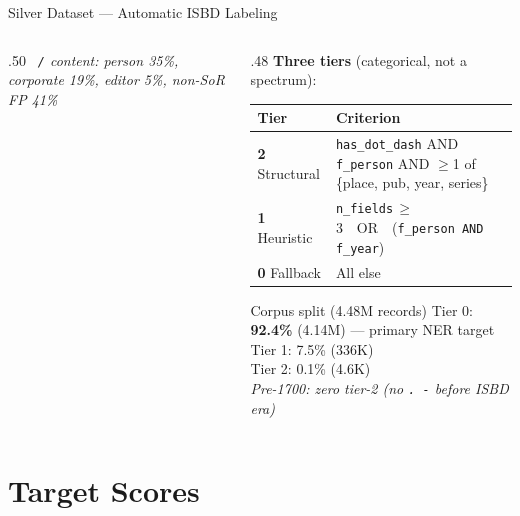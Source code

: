\documentclass[xcolor,aspectratio=169,compress]{beamer}
\begin{document}
\begin{frame}{Silver Dataset --- Automatic ISBD Labeling}
\begin{columns}
\begin{column}{.50\textwidth}
      \textit{\texttt{ /} content: person 35\%, corporate 19\%, editor 5\%, non-SoR FP 41\%}
    \end{column}
    \begin{column}{.48\textwidth}
      \textbf{Three tiers} (categorical, not a spectrum):
      \smallskip
      \begin{tabular}{lp{4.5cm}}
        \toprule
        Tier & Criterion \\
        \midrule
        \textbf{2} Structural &
          \texttt{has\_dot\_dash} AND \texttt{f\_person} AND $\geq$1 of \{place, pub, year, series\} \\[3pt]
        \textbf{1} Heuristic &
          \texttt{n\_fields}$\,\geq\,$3\ \ OR\ \ (\texttt{f\_person AND f\_year}) \\[3pt]
        \textbf{0} Fallback &
          All else \\
        \bottomrule
      \end{tabular}
      \smallskip
      \begin{block}{Corpus split (4.48M records)}
        Tier 0: \textbf{92.4\%} (4.14M) --- primary NER target \\
        Tier 1: 7.5\% (336K) \\
        Tier 2: 0.1\% (4.6K) \\
        \textit{Pre-1700: zero tier-2 (no \texttt{. -} before ISBD era)}
      \end{block}
    \end{column}
  \end{columns}
\end{frame}

\section{Target Scores}
\end{document}
